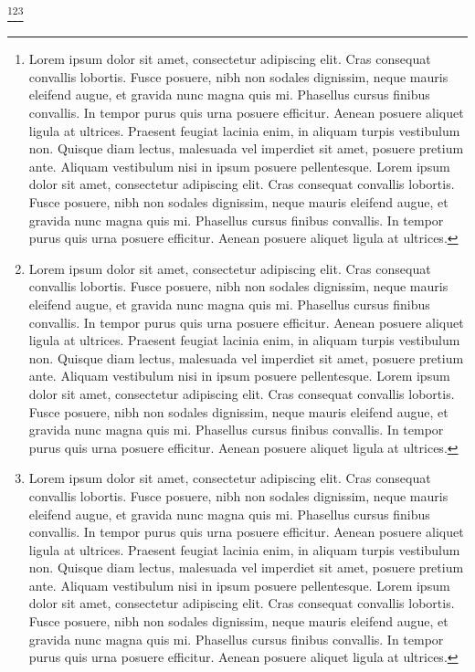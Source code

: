 \lipsum\footnote{ Lorem ipsum dolor sit amet, consectetur adipiscing elit. Cras consequat convallis lobortis. Fusce posuere, nibh non sodales dignissim, neque mauris eleifend augue, et gravida nunc magna quis mi. Phasellus cursus finibus convallis. In tempor purus quis urna posuere efficitur. Aenean posuere aliquet ligula at ultrices. Praesent feugiat lacinia enim, in aliquam turpis vestibulum non. Quisque diam lectus, malesuada vel imperdiet sit amet, posuere pretium ante. Aliquam vestibulum nisi in ipsum posuere pellentesque. Lorem ipsum dolor sit amet, consectetur adipiscing elit. Cras consequat convallis lobortis. Fusce posuere, nibh non sodales dignissim, neque mauris eleifend augue, et gravida nunc magna quis mi. Phasellus cursus finibus convallis. In tempor purus quis urna posuere efficitur. Aenean posuere aliquet ligula at ultrices.}\lipsum\lipsum\footnote{ Lorem ipsum dolor sit amet, consectetur adipiscing elit. Cras consequat convallis lobortis. Fusce posuere, nibh non sodales dignissim, neque mauris eleifend augue, et gravida nunc magna quis mi. Phasellus cursus finibus convallis. In tempor purus quis urna posuere efficitur. Aenean posuere aliquet ligula at ultrices. Praesent feugiat lacinia enim, in aliquam turpis vestibulum non. Quisque diam lectus, malesuada vel imperdiet sit amet, posuere pretium ante. Aliquam vestibulum nisi in ipsum posuere pellentesque. Lorem ipsum dolor sit amet, consectetur adipiscing elit. Cras consequat convallis lobortis. Fusce posuere, nibh non sodales dignissim, neque mauris eleifend augue, et gravida nunc magna quis mi. Phasellus cursus finibus convallis. In tempor purus quis urna posuere efficitur. Aenean posuere aliquet ligula at ultrices.}\lipsum\lipsum\footnote{ Lorem ipsum dolor sit amet, consectetur adipiscing elit. Cras consequat convallis lobortis. Fusce posuere, nibh non sodales dignissim, neque mauris eleifend augue, et gravida nunc magna quis mi. Phasellus cursus finibus convallis. In tempor purus quis urna posuere efficitur. Aenean posuere aliquet ligula at ultrices. Praesent feugiat lacinia enim, in aliquam turpis vestibulum non. Quisque diam lectus, malesuada vel imperdiet sit amet, posuere pretium ante. Aliquam vestibulum nisi in ipsum posuere pellentesque. Lorem ipsum dolor sit amet, consectetur adipiscing elit. Cras consequat convallis lobortis. Fusce posuere, nibh non sodales dignissim, neque mauris eleifend augue, et gravida nunc magna quis mi. Phasellus cursus finibus convallis. In tempor purus quis urna posuere efficitur. Aenean posuere aliquet ligula at ultrices.}\lipsum



